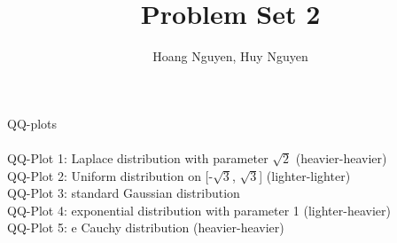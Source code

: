 \documentclass[10pt]{article}
\newenvironment{problem}[2][Problem]{\begin{trivlist}
\item[\hskip \labelsep {\bfseries #1}\hskip \labelsep {\bfseries #2.}]}{\end{trivlist}}
\begin{document}
\title{Problem Set 2}
\author{Hoang Nguyen, Huy Nguyen}
\maketitle
    
\begin{problem}{1} 
QQ-plots \\
\\
QQ-Plot 1: Laplace distribution with parameter $\sqrt{2}$ (heavier-heavier) \\
QQ-Plot 2: Uniform distribution on [-$\sqrt{3}$, $\sqrt{3}$] (lighter-lighter) \\
QQ-Plot 3: standard Gaussian distribution \\
QQ-Plot 4: exponential distribution with parameter 1 (lighter-heavier)\\
QQ-Plot 5: e Cauchy distribution (heavier-heavier)\\







\end{problem}
\end{document}

